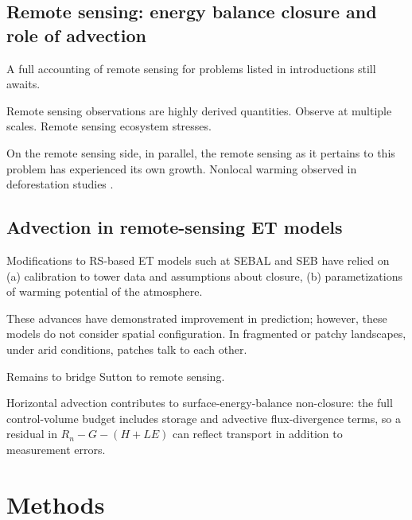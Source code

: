 \documentclass{article}
\begin{document}

    \subsection{Remote sensing: energy balance closure and role of advection}

    A full accounting of remote sensing for problems listed in introductions still awaits.

    Remote sensing observations are highly derived quantities. Observe at multiple scales. Remote sensing ecosystem stresses. 

    On the remote sensing side, in parallel, the remote sensing as it pertains to this problem has experienced its own growth. 
    Nonlocal warming observed in deforestation studies \cite{cohn_forest_2019}.

    \subsection{Advection in remote-sensing ET models}

    Modifications to RS-based ET models such at SEBAL and SEB have relied on 
    (a) calibration to tower data and assumptions about closure, 
    (b) parametizations of warming potential of the atmosphere.

    
    
    These advances have demonstrated improvement in prediction; however, these models do not consider spatial configuration.
    In fragmented or patchy landscapes, under arid conditions, patches talk to each other. 

    Remains to bridge Sutton to remote sensing. 

    Horizontal advection contributes to surface-energy-balance non-closure: the full control-volume budget includes storage and advective flux-divergence terms, so a residual in $R_n - G - (H+LE)$ can reflect transport in addition to measurement errors. 

    
    
    
    \section{Methods}
\end{document}
